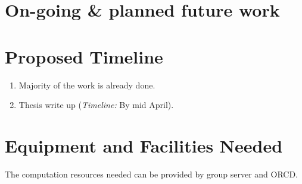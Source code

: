 \documentclass{article}
\begin{document}
%




%


\section{On-going \& planned future work}






\section{Proposed Timeline}

\begin{enumerate}
\item Majority of the work is already done.
\item Thesis write up (\emph{Timeline:} By mid April).
\end{enumerate}


\section{Equipment and Facilities Needed}

The computation resources needed can be provided by group server and ORCD. 







\end{document}
